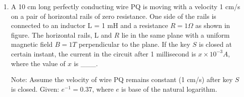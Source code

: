
\begin{enumerate}
    \item A 10 cm long perfectly conducting wire PQ is moving with a velocity 1 cm/s on a pair of horizontal rails of zero resistance. One side of the rails is connected to an inductor L = 1 mH and a resistance \(R = 1 \Omega\) as shown in figure. The horizontal rails, L and \(R\) lie in the same plane with a uniform magnetic field \(B = 1 T\) perpendicular to the plane. If the key \(S\) is closed at certain instant, the current in the circuit after 1 millisecond is \(x \times 10^{-3} A\), where the value of \(x\) is \_\_\_.
    \begin{center}
    \end{center}
    \item[Note:] Assume the velocity of wire PQ remains constant (1 cm/s) after key \(S\) is closed. Given: \(e^{-1} = 0.37\), where \(e\) is base of the natural logarithm.
\end{enumerate}

